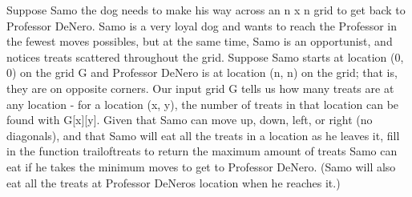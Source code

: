 
Suppose Samo the dog needs to make his way across an n x n grid to get back to Professor DeNero. 
Samo is a very loyal dog and wants to reach the Professor in the fewest moves possibles, but at 
the same time, Samo is an opportunist, and notices treats scattered throughout the grid.
\newline
Suppose Samo starts at location (0, 0) on the grid G and Professor DeNero is at location (n, n) 
on the grid; that is, they are on opposite corners. Our input grid G tells us how many treats are 
at any location - for a location (x, y), the number of treats in that location can be found with G[x][y]. 
Given that Samo can move up, down, left, or right (no diagonals), and that Samo will eat all the treats 
in a location as he leaves it, fill in the function trail\textunderscore of\textunderscore treats to return 
the maximum amount of treats Samo can eat if he takes the minimum moves to get to Professor DeNero. 
(Samo will also eat all the treats at Professor DeNeros location when he reaches it.)



\vfill
\makebox{\hspace*{-1.8cm}\solutionimage{}{}}
\vfill


%
%
%
%
%
%
%
%
